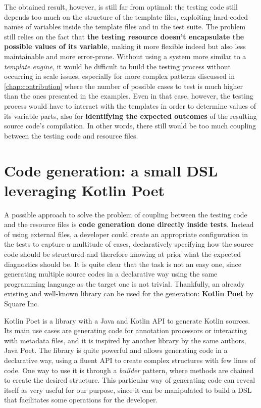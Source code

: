 \documentclass[12pt,a4paper,openright,twoside]{book}
\begin{document}
The obtained result, however, is still far from optimal: the testing code still
depends too much on the structure of the template files, exploiting hard-coded
names of variables inside the template files and in the test suite. The problem
still relies on the fact that \textbf{the testing resource doesn't encapsulate
the possible values of its variable}, making it more flexible indeed but also
less maintainable and more error-prone. 
%
Without using a system more similar to a \emph{template engine}, it would be
difficult to build the testing process without occurring in scale issues,
especially for more complex patterns discussed in \cref{chap:contribution} where
the number of possible cases to test is much higher than the ones presented in
the examples. Even in that case, however, the testing process would have to
interact with the templates in order to determine values of its variable parts,
also for \textbf{identifying the expected outcomes} of the resulting source
code's compilation. In other words, there still would be too much coupling
between the testing code and resource files.

\section{Code generation: a small DSL leveraging Kotlin Poet}

A possible approach to solve the problem of coupling between the testing code
and the resource files is \textbf{code generation done directly inside tests}.
Instead of using external files, a developer could create an appropriate
configuration in the tests to capture a multitude of cases, declaratively 
specifying how the source code should be structured and therefore knowing at
prior what the expected diagnostics should be.
%
It is quite clear that the task is not an easy one, since generating multiple 
source codes in a declarative way using the same programming language as the
target one is not trivial. Thankfully, an already existing and well-known 
library can be used for the generation: \textbf{Kotlin Poet} by Square Inc.

Kotlin Poet is a library with a Java and Kotlin API to generate Kotlin sources.
Its main use cases are generating code for annotation processors or interacting
with metadata files, and it is inspired by another library by the same authors,
Java Poet. 
%
The library is quite powerful and allows generating code in a declarative way,
using a fluent API to create complex structures with few lines of code. One
way to use it is through a \emph{builder} pattern, where methods are chained to
create the desired structure. This particular way of generating code can reveal
itself as very useful for our purpose, since it can be manipulated to build a 
\ac{DSL} that facilitates some operations for the developer.
\end{document}
